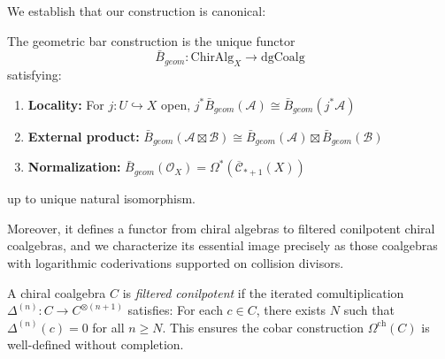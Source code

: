 We establish that our construction is canonical:

\begin{theorem}
The geometric bar construction is the unique functor 
$$\bar{B}_{geom}: \text{ChirAlg}_X \to \text{dgCoalg}$$
satisfying:
\begin{enumerate}
\item \textbf{Locality:} For $j: U \hookrightarrow X$ open, $j^*\bar{B}_{geom}(\mathcal{A}) \cong \bar{B}_{geom}(j^*\mathcal{A})$
\item \textbf{External product:} $\bar{B}_{geom}(\mathcal{A} \boxtimes \mathcal{B}) \cong \bar{B}_{geom}(\mathcal{A}) \boxtimes \bar{B}_{geom}(\mathcal{B})$
\item \textbf{Normalization:} $\bar{B}_{geom}(\mathcal{O}_X) = \Omega^*(\overline{\mathcal{C}}_{*+1}(X))$
\end{enumerate}
up to unique natural isomorphism.

Moreover, it defines a functor from chiral algebras to filtered conilpotent chiral coalgebras, and we characterize its essential image precisely as those coalgebras with logarithmic coderivations supported on collision divisors.
\end{theorem}

 
\begin{definition}
A chiral coalgebra $C$ is \emph{filtered conilpotent} if the iterated comultiplication 
$\Delta^{(n)} : C \to C^{\otimes(n+1)}$ satisfies: For each $c \in C$, there exists 
$N$ such that $\Delta^{(n)}(c) = 0$ for all $n \geq N$. This ensures the cobar 
construction $\Omega^{\text{ch}}(C)$ is well-defined without completion.
\end{definition}



